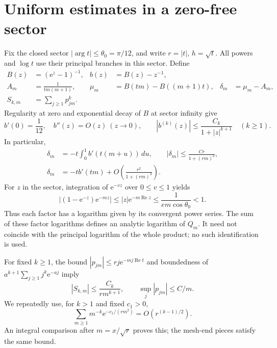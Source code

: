 \documentclass[11pt,letterpaper]{article}
\numberwithin{equation}{section}
\theoremstyle{definition}\newtheorem{definition}[theorem]{Definition}
\theoremstyle{remark}\newtheorem{remark}[theorem]{Remark}
\newcommand{\ee}{\mathrm e}
\DeclareMathOperator{\Rea}{Re}
\begin{document}
\section{Uniform estimates in a zero-free sector}\label{dmv:sum:sec:sector}
Fix the closed sector $|\arg t|\le\theta_0=\pi/12$, and write $r=|t|$, $h=\sqrt t$. All powers and $\log t$ use their principal branches in this sector. Define
\begin{align}\label{dmv:sum:eq:basic}
 B(z)&=(\ee^z-1)^{-1},& b(z)&=B(z)-z^{-1},\\
 A_m&=\frac1{tm(m+1)},&
 \mu_m&=B(tm)-B((m+1)t),& \delta_m&=\mu_m-A_m,\nonumber\\
 S_{k,m}&=\sum_{j\ge1}p_{jm}^k.&&\nonumber
\end{align}
Regularity at zero and exponential decay of $B$ at sector infinity give
\begin{equation}\label{dmv:sum:eq:bder}
 b'(0)=\frac1{12},\quad b''(z)=O(z)\ (z\to0),\qquad
 |b^{(k)}(z)|\le\frac{C_k}{1+|z|^{k+1}}\quad(k\ge1).
\end{equation}
In particular,
\begin{equation}\label{dmv:sum:eq:delta}
\begin{split}
 \delta_m&=-t\int_0^1b'(t(m+u))\,du,\qquad
 |\delta_m|\le\frac{Cr}{1+(rm)^2},\\
 \delta_m&=-tb'(tm)+O\!\left(\frac{r^2}{1+(rm)^3}\right).
\end{split}
\end{equation}
For $z$ in the sector, integration of $\ee^{-vz}$ over $0\le v\le1$ yields
\begin{equation}\label{dmv:sum:eq:zerofree}
 |(1-\ee^{-z})\ee^{-mz}|\le |z|\ee^{-m\Rea z}
 \le\frac1{em\cos\theta_0}<1.
\end{equation}
Thus each factor has a logarithm given by its convergent power series. The sum of these factor logarithms defines an analytic logarithm of $Q_m$. It need not coincide with the principal logarithm of the whole product; no such identification is used.

For fixed $k\ge1$, the bound $|p_{jm}|\le rj\ee^{-mj\Rea t}$ and boundedness of $a^{k+1}\sum_{j\ge1}j^k\ee^{-aj}$ imply
\begin{equation}\label{dmv:sum:eq:Sbound}
 |S_{k,m}|\le\frac{C_k}{rm^{k+1}},\qquad \sup_j|p_{jm}|\le C/m.
\end{equation}
We repeatedly use, for $k>1$ and fixed $c_1>0$,
\begin{equation}\label{dmv:sum:eq:sumest}
 \sum_{m\ge1}m^{-k}\ee^{-c_1/(rm^2)}=O(r^{(k-1)/2}).
\end{equation}
An integral comparison after $m=x/\sqrt r$ proves this; the mesh-end pieces satisfy the same bound.
\end{document}
